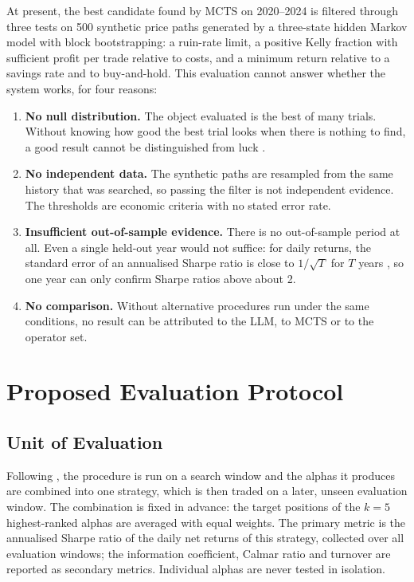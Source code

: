 \documentclass[12pt,a4paper,oneside]{book}
\theoremstyle{definition}
\begin{document}
At present, the best candidate found by MCTS on 2020--2024 is filtered through three tests on 500 synthetic price paths generated by a three-state hidden Markov model with block bootstrapping: a ruin-rate limit, a positive Kelly fraction with sufficient profit per trade relative to costs, and a minimum return relative to a savings rate and to buy-and-hold. This evaluation cannot answer whether the system works, for four reasons:
\begin{enumerate}
  \item \textbf{No null distribution.} The object evaluated is the best of many trials. Without knowing how good the best trial looks when there is nothing to find, a good result cannot be distinguished from luck \cite{white2000,harvey2015}.
  \item \textbf{No independent data.} The synthetic paths are resampled from the same history that was searched, so passing the filter is not independent evidence. The thresholds are economic criteria with no stated error rate.
  \item \textbf{Insufficient out-of-sample evidence.} There is no out-of-sample period at all. Even a single held-out year would not suffice: for daily returns, the standard error of an annualised Sharpe ratio is close to $1/\sqrt{T}$ for $T$ years \cite{lo2002}, so one year can only confirm Sharpe ratios above about 2.
  \item \textbf{No comparison.} Without alternative procedures run under the same conditions, no result can be attributed to the LLM, to MCTS or to the operator set.
\end{enumerate}

\section{Proposed Evaluation Protocol}
\label{sec:protocol}

\subsection{Unit of Evaluation}

Following \cite{shi2026,ren2024,xu2024}, the procedure is run on a search window and the alphas it produces are combined into one strategy, which is then traded on a later, unseen evaluation window. The combination is fixed in advance: the target positions of the $k = 5$ highest-ranked alphas are averaged with equal weights. The primary metric is the annualised Sharpe ratio of the daily net returns of this strategy, collected over all evaluation windows; the information coefficient, Calmar ratio and turnover are reported as secondary metrics. Individual alphas are never tested in isolation.
\end{document}
